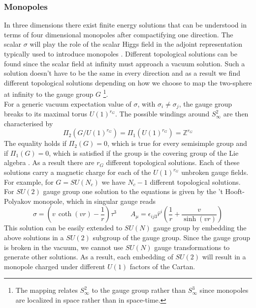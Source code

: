 \subsubsection{Monopoles}
In three dimensions there exist finite energy solutions that can be understood in terms of four dimensional monopoles after compactifying one direction.
The scalar $\sigma$ will play the role of the scalar Higgs field in the adjoint representation typically used to introduce monopoles \cite{Weinberg:2006rq}.
Different topological solutions can be found since the scalar field at infinity must approach a vacuum solution.
Such a solution doesn't have to be the same in every direction and as a result we find different topological solutions depending on how we choose to map the two-sphere at infinity to the gauge group $G$ \footnote{The mapping relates $S^2_{\infty}$ to the gauge group rather than $S^3_{\infty}$ since monopoles are localized in space rather than in space-time.}.\\
For a generic vacuum expectation value of $\sigma$, with $\sigma_i \neq \sigma_j$, the gauge group breaks to its maximal torus $U(1)^{r_G}$.
The possible windings around $S^2_{\infty}$ are then characterised by
\begin{equation}
 \Pi_{2} \left( G / U(1)^{r_G} \right) = \Pi_1 (U(1)^{r_G}) = \mathbb{Z}^{r_G}
\end{equation}
The equality holds if $\Pi_2(G) = 0$, which is true for every semisimple group and if $\Pi_1(G) = 0$, which is satisfied if the group is the covering group of the Lie algebra \cite{Weinberg:2006rq}.
As a result there are $r_G$ different topological solutions.
Each of these solutions carry a magnetic charge for each of the $U(1)^{r_G}$ unbroken gauge fields. 
For example, for $G= SU(N_c)$ we have $N_c-1$ different topological solutions.
\\
For $SU(2)$ gauge group one solution to the equations is given by the 't Hooft-Polyakov monopole, which in singular gauge reads \cite{Csaki:2014cwa}
\begin{equation}
  \sigma = \left( v \, \coth (v r) - \frac{1}{r} \right)  \tau^3 \qquad A_{\mu} = \epsilon_{i j 3} \hat{r}^i \left( \frac{1}{r} + \frac{v}{\sinh (vr)} \right)
\end{equation}
This solution can be easily extended to $SU(N)$ gauge group by embedding the above solutions in a $SU(2)$ subgroup of the gauge group.
Since the gauge group is broken in the vacuum, we cannot use $SU(N)$ gauge transformations to generate other solutions.
As a result, each embedding of $SU(2)$ will result in a monopole charged under different $U(1)$ factors of the Cartan. 
